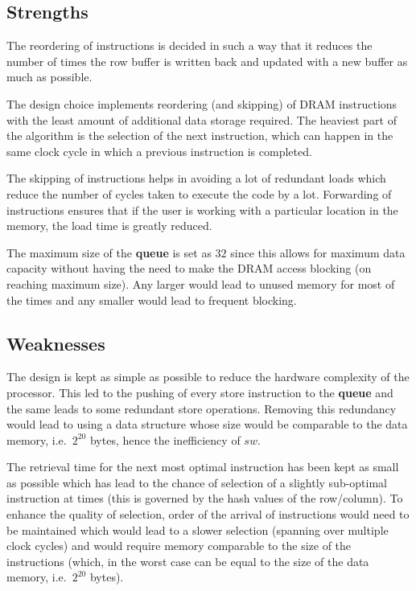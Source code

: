 \documentclass{article}
\begin{document}
\subsection{Strengths}
The reordering of instructions is decided in such a way that it reduces the number of times the row buffer is written back and updated with a new buffer as much as possible.\par
The design choice implements reordering (and skipping) of DRAM instructions with the least amount of additional data storage required. The heaviest part of the algorithm is the selection of the next instruction, which can happen in the same clock cycle in which a previous instruction is completed.\par
The skipping of instructions helps in avoiding a lot of redundant loads which reduce the number of cycles taken to execute the code by a lot. Forwarding of instructions ensures that if the user is working with a particular location in the memory, the load time is greatly reduced.\par
The maximum size of the \textbf{queue} is set as $32$ since this allows for maximum data capacity without having the need to make the DRAM access blocking (on reaching maximum size). Any larger would lead to unused memory for most of the times and any smaller would lead to frequent blocking.

\subsection{Weaknesses}
The design is kept as simple as possible to reduce the hardware complexity of the processor. This led to the pushing of every store instruction to the \textbf{queue} and the same leads to some redundant store operations. Removing this redundancy would lead to using a data structure whose size would be comparable to the data memory, i.e.\ $2^{20}$ bytes, hence the inefficiency of $sw$.\par
The retrieval time for the next most optimal instruction has been kept as small as possible which has lead to the chance of selection of a slightly sub-optimal instruction at times (this is governed by the hash values of the row/column). To enhance the quality of selection, order of the arrival of instructions would need to be maintained which would lead to a slower selection (spanning over multiple clock cycles) and would require memory comparable to the size of the instructions (which, in the worst case can be equal to the size of the data memory, i.e.\ $2^{20}$ bytes).
\end{document}
